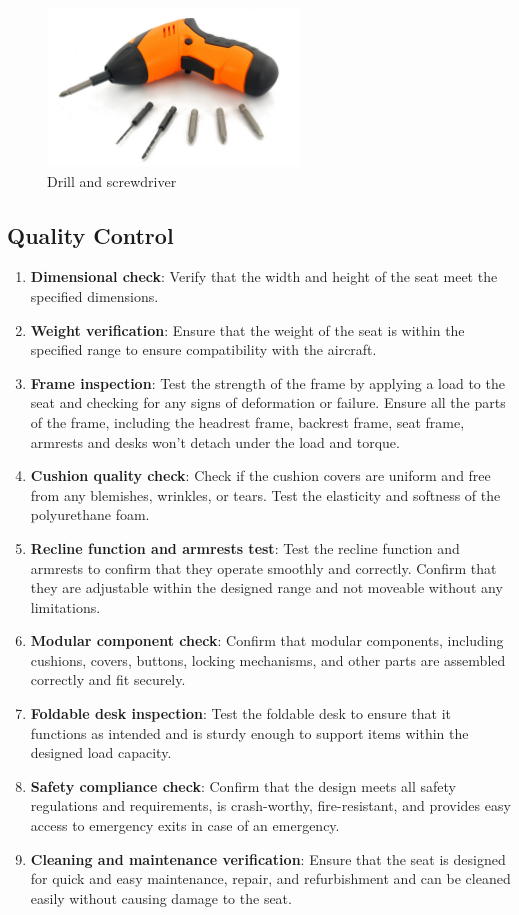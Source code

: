 \begin{figure}[!htp]
    \centering
    \includegraphics[width=0.6\textwidth]{images/dns.jpg}
    \caption{Drill and screwdriver}
    \label{fig:dns}
\end{figure}

\subsection{Quality Control} \label{sec:QC}
\begin{enumerate}
    \item \textbf{Dimensional check}: Verify that the width and height of the seat meet the specified dimensions.
    \item \textbf{Weight verification}: Ensure that the weight of the seat is within the specified range to ensure compatibility with the aircraft.
    \item \textbf{Frame inspection}: Test the strength of the frame by applying a load to the seat and checking for any signs of deformation or failure. Ensure all the parts of the frame, including the headrest frame, backrest frame, seat frame, armrests and desks won't detach under the load and torque.
    \item \textbf{Cushion quality check}: Check if the cushion covers are uniform and free from any blemishes, wrinkles, or tears. Test the 
    elasticity and softness of the polyurethane foam.
    \item \textbf{Recline function and armrests test}: Test the recline function and armrests to confirm that they operate smoothly and correctly. Confirm that they are adjustable within the designed range and not moveable without any limitations.
    \item \textbf{Modular component check}: Confirm that modular components, including cushions, covers, buttons, locking mechanisms, and other parts are assembled correctly and fit securely.
    \item \textbf{Foldable desk inspection}: Test the foldable desk to ensure that it functions as intended and is sturdy enough to support items within the designed load capacity.
    \item \textbf{Safety compliance check}: Confirm that the design meets all safety regulations and requirements, is crash-worthy, fire-resistant, and provides easy access to emergency exits in case of an emergency.
    \item \textbf{Cleaning and maintenance verification}: Ensure that the seat is designed for quick and easy maintenance, repair, and refurbishment and can be cleaned easily without causing damage to the seat.
\end{enumerate}